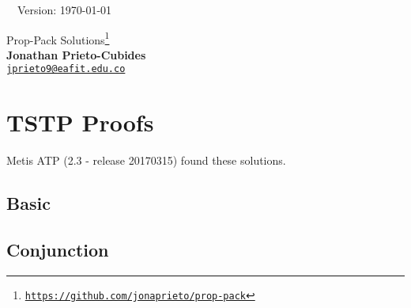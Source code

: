\documentclass[12pt]{article}
\newcommand{\problemtptp}[3][c]{}
\begin{document}

\hrulefill\ \ Version: \today\\

\vspace{3mm}
\begin{center}
{\Large Prop-Pack Solutions\footnote{
\href{https://github.com/jonaprieto/prop-pack}{{\color{blue(munsell)}
\texttt{https://github.com/jonaprieto/prop-pack}}}}
}\\
\textbf{Jonathan Prieto-Cubides}\\ %
\href{mailto:jprieto9@eafit.edu.co}{{\color{blue(munsell)}\texttt{jprieto9@eafit.edu.co}}}
\end{center}
\vspace{0.1 cm}

\tableofcontents

\section{TSTP Proofs}
Metis ATP (2.3 - release 20170315) found these solutions.
\subsection{Basic}
\problemtptp[basic-1.tptp]{problems/basic/basic-1.tstp}{2}
\problemtptp[basic-2.tptp]{problems/basic/basic-2.tstp}{2}
\problemtptp[basic-3.tptp]{problems/basic/basic-3.tstp}{2}
\problemtptp[basic-4.tptp]{problems/basic/basic-4.tstp}{2}

\subsection{Conjunction}
\problemtptp[conj-1.tptp]{problems/conjunction/conj-1.tstp}{2}
\problemtptp[conj-2.tptp]{problems/conjunction/conj-2.tstp}{2}
\problemtptp[conj-3.tptp]{problems/conjunction/conj-3.tstp}{2}
\problemtptp[conj-4.tptp]{problems/conjunction/conj-4.tstp}{2}
\problemtptp[conj-5.tptp]{problems/conjunction/conj-5.tstp}{2}
\problemtptp[conj-6.tptp]{problems/conjunction/conj-6.tstp}{2}
\end{document}
